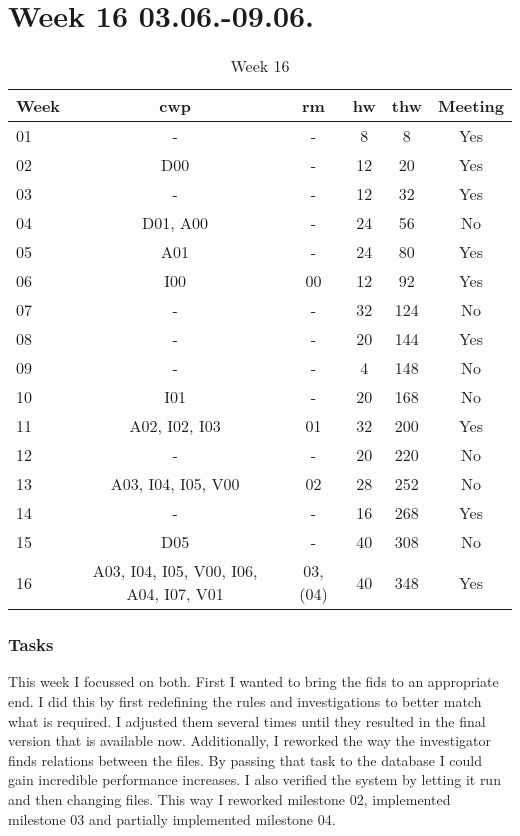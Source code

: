 \section{Week 16 03.06.-09.06.}
\label{sec:journal:week16}


\begin{table}[!ht]
    \begin{center}
        \caption{Week 16}
        \label{tab:journal:week16}
        \begin{tabular}{l|c|c|c|c|c}
            \textbf{Week} & \textbf{\gls{cwp}} & \textbf{\gls{rm}} & \textbf{\gls{hw}} & \textbf{\gls{thw}} & \textbf{Meeting}\\
        \hline
        01 & - & - & 8 & 8 & Yes \\
        02 & D00 & - & 12 & 20 & Yes \\
        03 & - & - & 12 & 32 & Yes \\
        04 & D01, A00 & - & 24 & 56 & No \\
        05 & A01 & - & 24 & 80 & Yes \\
        06 & I00 & 00 & 12 & 92 & Yes \\
        07 & - & - & 32 & 124 & No \\
        08 & - & - & 20 & 144 & Yes \\
        09 & - & - & 4 & 148 & No \\
        10 & I01 & - & 20 & 168 & No \\
        11 & A02, I02, I03 & 01 & 32 & 200 & Yes \\
        12 & - & - & 20 & 220 & No \\
        13 & A03, I04, I05, V00 & 02 & 28 & 252 & No \\
        14 & - & - & 16 & 268 & Yes \\
        15 & D05 & - & 40 & 308 & No \\
        16 & A03, I04, I05, V00, I06, A04, I07, V01 & 03, (04) & 40 & 348 & Yes \\
        \end{tabular}
    \end{center}
\end{table}

\subsubsection{Tasks}

This week I focussed on both. First I wanted to bring the \gls{fids} to an appropriate end. I did this by first redefining the rules and investigations to better match what is required. I adjusted them several times until they resulted in the final version that is available now. Additionally, I reworked the way the investigator finds relations between the files. By passing that task to the database I could gain incredible performance increases. I also verified the system by letting it run and then changing files. This way I reworked milestone 02, implemented milestone 03 and partially implemented milestone 04. 

